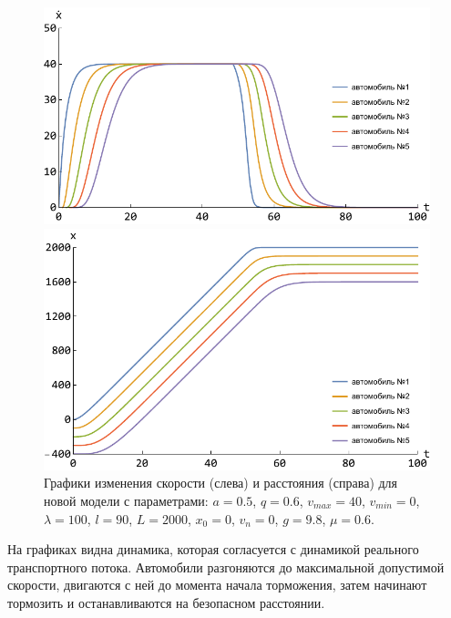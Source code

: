 \documentclass[12pt, a4paper]{extarticle}
\numberwithin{equation}{section}
\numberwithin{figure}{section}
\begin{document}
\begin{figure}[h!]
	\begin{center}
		\begin{minipage}[h!]{0.48\linewidth}
			\includegraphics[width=1\linewidth,height=0.2\textheight]
			{Im/new_model_speed.pdf}
		\end{minipage}
		\hfill 
		\begin{minipage}[h!]{0.48\linewidth}
			\includegraphics[width=1\linewidth,height=0.2\textheight]
			{Im/new_model_distanse.pdf}
		\end{minipage}
		\caption{Графики изменения скорости (слева) и расстояния (справа) для новой модели с параметрами: $a=0.5$, $q=0.6$, $v_{max}=40$, $v_{min}=0$, $\lambda=100$, $l=90$, $L=2000$, $x_0=0$, $v_n=0$, $g=9.8$, $\mu=0.6$. }
		\label{new_model_picture}
	\end{center}
\end{figure}

На графиках видна динамика, которая согласуется с динамикой реального транспортного потока. Автомобили разгоняются до максимальной допустимой скорости, двигаются с ней до момента начала торможения, затем начинают тормозить и останавливаются на безопасном расстоянии. 
\end{document}
